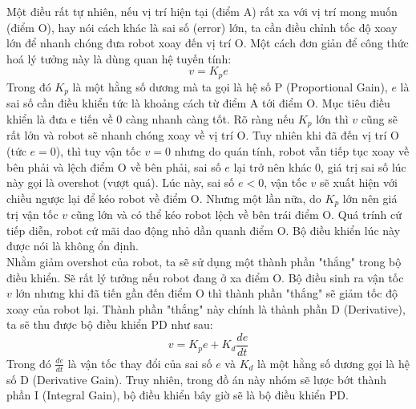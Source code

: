 \noindent Một điều rất tự nhiên, nếu vị trí hiện tại (điểm A) rất xa với vị trí mong muốn (điểm O), hay nói cách khác là sai số (error) lớn, ta cần điều chỉnh tốc độ xoay lớn để nhanh chóng đưa robot xoay đến vị trí O. Một cách đơn giản để công thức hoá lý tưởng này là dùng quan hệ tuyến tính:
\begin{equation}
    v = K_pe
\end{equation}
Trong đó $K_p$ là một hằng số dương mà ta gọi là hệ số P (Proportional Gain), $e$ là sai số cần điều khiển tức là khoảng cách từ điểm A tới điểm O. Mục tiêu điều khiển là đưa e tiến về 0 càng nhanh càng tốt. Rõ ràng nếu $K_p$ lớn thì $v$ cũng sẽ rất lớn và robot sẽ nhanh chóng xoay về vị trí O. Tuy nhiên khi đã đến vị trí O (tức $e = 0$), thì tuy vận tốc $v = 0$ nhưng do quán tính, robot vẫn tiếp tục xoay về bên phải và lệch điểm O về bên phải, sai số $e$ lại trở nên khác 0, giá trị sai số lúc này gọi là overshot (vượt quá). Lúc này, sai số $e < 0$, vận tốc $v$ sẽ xuất hiện với chiều ngược lại để kéo robot về điểm O. Nhưng một lần nữa, do $K_p$ lớn nên giá trị vận tốc $v$ cũng lớn và có thể kéo robot lệch về bên trái điểm O. Quá trính cứ tiếp diễn, robot cứ mãi dao động nhỏ dần quanh điểm O. Bộ điều khiển lúc này được nói là không ổn định.\\

\noindent Nhằm giảm overshot của robot, ta sẽ sử dụng một thành phần "thắng" trong bộ điều khiển. Sẽ rất lý tưởng nếu robot đang ở xa điểm O. Bộ điều sinh ra vận tốc $v$ lớn nhưng khi đã tiến gần đến điểm O thì thành phần "thắng" sẽ giảm tốc độ xoay của robot lại. Thành phần "thắng" này chính là thành phần D (Derivative), ta sẽ thu được bộ điều khiển PD như sau:
\begin{equation}
    v = K_pe + K_d\frac{de}{dt}
\end{equation}
Trong đó $\frac{de}{dt}$ là vận tốc thay đổi của sai số $e$ và $K_d$ là một hằng số dương gọi là hệ số D (Derivative Gain). Truy nhiên, trong đồ án này nhóm sẽ lược bớt thành phần I (Integral Gain), bộ điều khiển bây giờ sẽ là bộ điều khiển PD.\\

